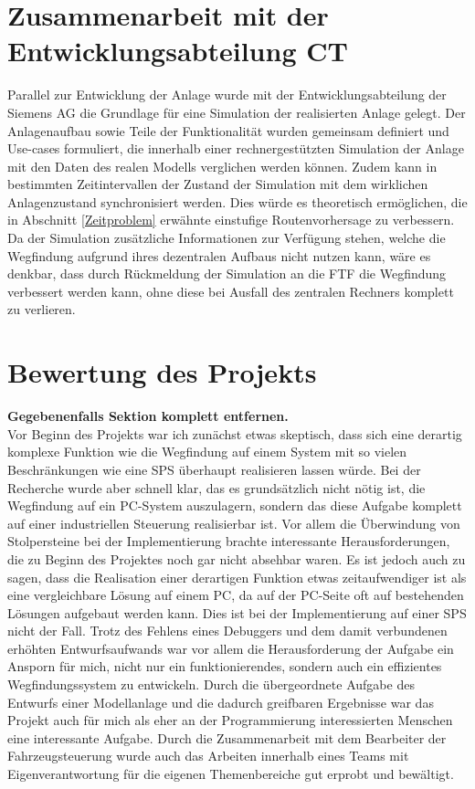 \section{Zusammenarbeit mit der Entwicklungsabteilung \ac{CT}}

	Parallel zur Entwicklung der Anlage wurde mit der Entwicklungsabteilung der Siemens AG die Grundlage für eine Simulation der realisierten Anlage gelegt. Der Anlagenaufbau sowie Teile der Funktionalität wurden gemeinsam definiert und Use-cases formuliert, die innerhalb einer rechnergestützten Simulation der Anlage mit den Daten des realen Modells verglichen werden können. Zudem kann in bestimmten Zeitintervallen der Zustand der Simulation mit dem wirklichen Anlagenzustand synchronisiert werden. Dies würde es theoretisch ermöglichen, die in Abschnitt \ref{Zeitproblem} erwähnte einstufige Routenvorhersage zu verbessern. Da der Simulation zusätzliche Informationen zur Verfügung stehen, welche die Wegfindung aufgrund ihres dezentralen Aufbaus nicht nutzen kann, wäre es denkbar, dass durch Rückmeldung der Simulation an die \ac{FTF} die Wegfindung verbessert werden kann, ohne diese bei Ausfall des zentralen Rechners komplett zu verlieren.
	
\section{Bewertung des Projekts}
	
	\textbf{Gegebenenfalls Sektion komplett entfernen.}
	\\
	Vor Beginn des Projekts war ich zunächst etwas skeptisch, dass sich eine derartig komplexe Funktion wie die Wegfindung auf einem System mit so vielen Beschränkungen wie eine \ac{SPS} überhaupt realisieren lassen würde. Bei der Recherche wurde aber schnell klar, das es grundsätzlich nicht nötig ist, die Wegfindung auf ein PC-System auszulagern, sondern das diese Aufgabe komplett auf einer industriellen Steuerung realisierbar ist. Vor allem die Überwindung von Stolpersteine bei der Implementierung brachte interessante Herausforderungen, die zu Beginn des Projektes noch gar nicht absehbar waren. Es ist jedoch auch zu sagen, dass die Realisation einer derartigen Funktion etwas zeitaufwendiger ist als eine vergleichbare Lösung auf einem PC, da auf der PC-Seite oft auf bestehenden Lösungen aufgebaut werden kann. Dies ist bei der Implementierung auf einer \ac{SPS} nicht der Fall. Trotz des Fehlens eines Debuggers und dem damit verbundenen erhöhten Entwurfsaufwands war vor allem die Herausforderung der Aufgabe ein Ansporn für mich, nicht nur ein funktionierendes, sondern auch ein effizientes Wegfindungssystem zu entwickeln. Durch die übergeordnete Aufgabe des Entwurfs einer Modellanlage und die dadurch greifbaren Ergebnisse war das Projekt auch für mich als eher an der Programmierung interessierten Menschen eine interessante Aufgabe. Durch die Zusammenarbeit mit dem Bearbeiter der Fahrzeugsteuerung wurde auch das Arbeiten innerhalb eines Teams mit Eigenverantwortung für die eigenen Themenbereiche gut erprobt und bewältigt.

